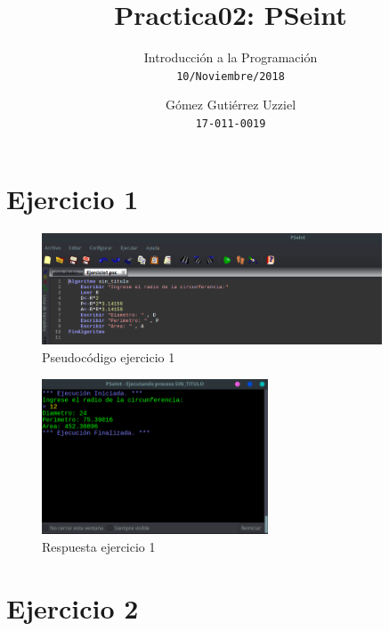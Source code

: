 \documentclass[11pt, a4paper]{report}
\begin{document}
\title{Practica02: PSeint}
\author{
  Introducci\'on a la Programaci\'on\\
  \texttt{10/Noviembre/2018}
  \and
  G\'omez Guti\'errez Uzziel\\
  \texttt{17-011-0019}
}
\date{}
\maketitle

\section*{Ejercicio 1}

\begin{figure}[!ht]
\begin{center}
  \includegraphics[width=0.9\textwidth]{ejercicio1.png}
  \caption{Pseudoc\'odigo ejercicio 1}
\end{center}
\end{figure}

\begin{figure}[!ht]
\begin{center}
  \includegraphics[width=0.6\textwidth]{respuesta1.png}
  \caption{Respuesta ejercicio 1}
\end{center}
\end{figure}
 	
 \newpage	
\section*{Ejercicio 2}
\end{document}

